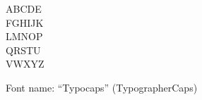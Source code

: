 \documentclass[a4paper]{article}
\begin{document}
\begin{center}
\fontsize{60pt}{72pt}
  ABCDE \\
  FGHIJK \\
  LMNOP \\
  QRSTU \\
  VWXYZ \\
\end{center}
\vfill
\begin{center}
Font name: ``Typocaps'' (TypographerCaps)
\end{center}
\end{document}
